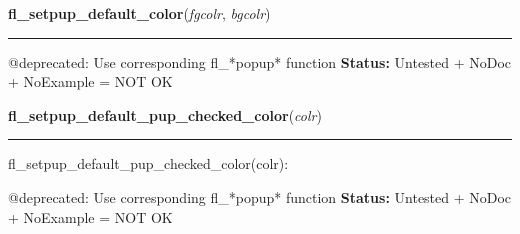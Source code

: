     \label{xformslib:deprecated:fl_setpup_default_color}

    \vspace{0.5ex}

\hspace{.8\funcindent}\begin{boxedminipage}{\funcwidth}

    \raggedright \textbf{fl\_setpup\_default\_color}(\textit{fgcolr}, \textit{bgcolr})

    \vspace{-1.5ex}

    \rule{\textwidth}{0.5\fboxrule}
\setlength{\parskip}{2ex}

@deprecated: Use corresponding fl\_*popup* function
\setlength{\parskip}{1ex}
\textbf{Status:} 
Untested + NoDoc + NoExample = NOT OK


    \end{boxedminipage}

    \label{xformslib:deprecated:fl_setpup_default_pup_checked_color}

    \vspace{0.5ex}

\hspace{.8\funcindent}\begin{boxedminipage}{\funcwidth}

    \raggedright \textbf{fl\_setpup\_default\_pup\_checked\_color}(\textit{colr})

    \vspace{-1.5ex}

    \rule{\textwidth}{0.5\fboxrule}
\setlength{\parskip}{2ex}

fl\_setpup\_default\_pup\_checked\_color(colr):

@deprecated: Use corresponding fl\_*popup* function
\setlength{\parskip}{1ex}
\textbf{Status:} 
Untested + NoDoc + NoExample = NOT OK


    \end{boxedminipage}

    \label{xformslib:deprecated:fl_setpup_default_fontsize}

